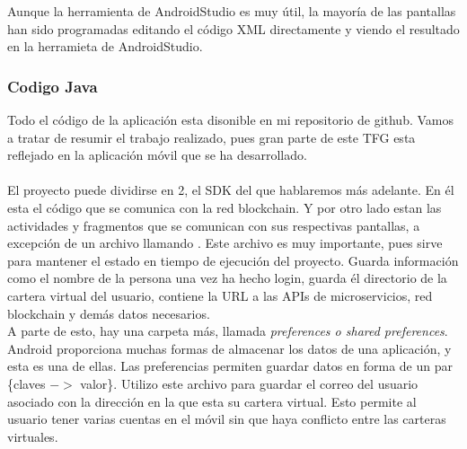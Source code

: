 Aunque la herramienta de AndroidStudio es muy útil, la mayoría de las pantallas han sido programadas editando el código XML directamente y viendo el resultado en la herramieta de AndroidStudio.

\subsubsection{Codigo Java}

Todo el código de la aplicación esta disonible en mi repositorio de github\cite{forgis98}. Vamos a tratar de resumir el trabajo realizado, pues gran parte de este TFG esta reflejado en la aplicación móvil que se ha desarrollado. \\

 \\

El proyecto puede dividirse en 2, el SDK del que hablaremos más adelante. En él esta el código que se comunica con la red blockchain. Y por otro lado estan las actividades y fragmentos que se comunican con sus respectivas pantallas, a excepción de un archivo llamando . Este archivo es muy importante, pues sirve para mantener el estado en tiempo de ejecución del proyecto. Guarda información como el nombre de la persona una vez ha hecho login, guarda él directorio de la cartera virtual del usuario, contiene la URL a las APIs de microservicios, red blockchain y demás datos necesarios. \\

A parte de esto, hay una carpeta más, llamada \emph{preferences o shared preferences}. Android proporciona muchas formas de almacenar los datos de una aplicación, y esta es una de ellas. Las preferencias permiten guardar datos en forma de un par \{claves $->$ valor\}. Utilizo este archivo para guardar el correo del usuario asociado con la dirección en la que esta su cartera virtual. Esto permite al usuario tener varias cuentas en el móvil sin que haya conflicto entre las carteras virtuales. 

 \\

